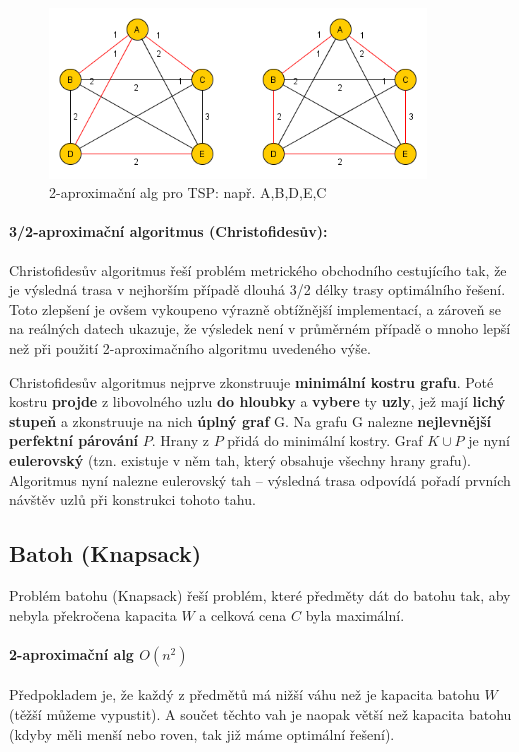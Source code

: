 \begin{figure}[h]
    \begin{center}
        \includegraphics[width=100mm]{spolecne/09/images/tsp-2aprox}
    \end{center}
    \caption{2-aproximační alg pro TSP: např. A,B,D,E,C}
\end{figure}

\paragraph{3/2-aproximační algoritmus (Christofidesův):}
Christofidesův algoritmus řeší problém metrického obchodního cestujícího tak, že je výsledná trasa v nejhorším případě dlouhá 3/2 délky trasy optimálního řešení. Toto zlepšení je ovšem vykoupeno výrazně obtížnější implementací, a zároveň se na reálných datech ukazuje, že výsledek není v průměrném případě o mnoho lepší než při použití 2-aproximačního algoritmu uvedeného výše.

Christofidesův algoritmus nejprve zkonstruuje \textbf{minimální kostru grafu}. Poté kostru \textbf{projde} z libovolného uzlu \textbf{do hloubky} a \textbf{vybere} ty \textbf{uzly}, jež mají \textbf{lichý stupeň} a zkonstruuje na nich \textbf{úplný graf} G. Na grafu G nalezne \textbf{nejlevnější perfektní párování} $P$. Hrany z $P$ přidá do minimální kostry. Graf $K \cup P$ je nyní \textbf{eulerovský} (tzn. existuje v něm tah, který obsahuje všechny hrany grafu). Algoritmus nyní nalezne eulerovský tah – výsledná trasa odpovídá pořadí prvních návštěv uzlů při konstrukci tohoto tahu.

\subsection{Batoh (Knapsack)}
Problém batohu (Knapsack) řeší problém, které předměty dát do batohu tak, aby nebyla překročena kapacita $W$ a celková cena $C$ byla maximální.

\paragraph{2-aproximační alg $O(n^2)$} Předpokladem je, že každý z předmětů má nižší váhu než je kapacita batohu $W$ (těžší můžeme vypustit). A součet těchto vah je naopak větší než kapacita batohu (kdyby měli menší nebo roven, tak již máme optimální řešení).

